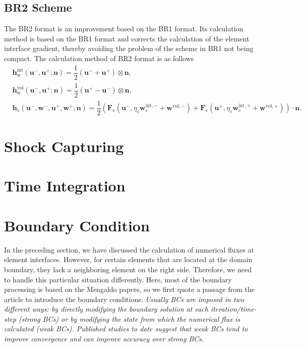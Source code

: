 \documentclass{develop-note}
\begin{document}
\subsection*{BR2 Scheme}

The BR2 format is an improvement based on the BR1 format. Its calculation method is based on the BR1 format and corrects the calculation of the element interface gradient, thereby avoiding the problem of the scheme in BR1 not being compact. The calculation method of BR2 format is as follows
\begin{equation}
  \begin{aligned}
  &\mathbf{h}^{\mathrm{int}}_{\mathrm{w}}(\mathbf{u}^{-},\mathbf{u}^{+};\mathbf{n})=\dfrac{1}{2}(\mathbf{u}^{-}+\mathbf{u}^{+})\otimes\mathbf{n},\\
  &\mathbf{h}^{\mathrm{vol}}_{\mathrm{w}}(\mathbf{u}^{-},\mathbf{u}^{+};\mathbf{n})=\dfrac{1}{2}(\mathbf{u}^{+}-\mathbf{u}^{-})\otimes\mathbf{n},\\
  &\mathbf{h}_{\mathrm{v}}(\mathbf{u}^{-},\mathbf{w}^{-},\mathbf{u}^{+},\mathbf{w}^{+};\mathbf{n})=\dfrac{1}{2}(\mathbf{F}_{\mathrm{v}}(\mathbf{u}^{-},\eta_{e}\mathbf{w}_{e}^{\mathrm{int},-}+\mathbf{w}^{\mathrm{vol},-})+\mathbf{F}_{\mathrm{v}}(\mathbf{u}^{+},\eta_{e}\mathbf{w}_{e}^{\mathrm{int},+}+\mathbf{w}^{\mathrm{vol},+}))\cdot\mathbf{n}.
  \end{aligned}
\end{equation}

\section{Shock Capturing}


\section{Time Integration}


\section{Boundary Condition}

In the preceding section, we have discussed the calculation of numerical fluxes at element interfaces. However, for certain elements that are located at the domain boundary, they lack a neighboring element on the right side. Therefore, we need to handle this particular situation differently. Here, most of the boundary processing is based on the Mengaldo\cite{mengaldoGuideImplementationBoundary2014} papers, so we first quote a passage from the article to introduce the boundary conditions: \textit{Usually BCs are imposed in two different ways: by directly modifying the boundary solution at each iteration/time-step (strong BCs) or by modifying the state from which the numerical flux is calculated (weak BCs). Published studies to date suggest that weak BCs tend to improve convergence and can improve accuracy over strong BCs.}
\end{document}
